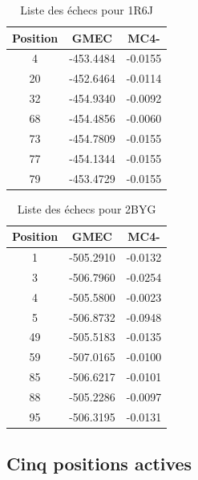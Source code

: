 \documentclass[a4paper,12pt]{article}
\begin{document}
    \begin{table}[h]
      \centering

      \begin{tabular}{|c|c|c|}


        \hline
        Position & GMEC & MC4- \\
        \hline
         4 & -453.4484 & -0.0155  \\
        20 & -452.6464 & -0.0114 \\
        32 & -454.9340 & -0.0092 \\
        68 & -454.4856 & -0.0060 \\
        73 & -454.7809 & -0.0155 \\
        77 & -454.1344 & -0.0155 \\
        79 & -453.4729 & -0.0155 \\
        
        \hline


      \end{tabular}      
      \caption{Liste des échecs pour 1R6J }
      \label{tab_echec1R6J__1}      
    \end{table}


    \begin{table}[h]
      \centering

      \begin{tabular}{|c|c|c|}

        \hline
        Position & GMEC & MC4- \\
        \hline
        1 & -505.2910 & -0.0132 \\
        3 & -506.7960 & -0.0254 \\
        4 & -505.5800 & -0.0023 \\
        5 & -506.8732 & -0.0948 \\
        49 & -505.5183 & -0.0135 \\
        59 & -507.0165 & -0.0100 \\
        85 & -506.6217 & -0.0101 \\
        88 & -505.2286 & -0.0097 \\
        95 & -506.3195 & -0.0131 \\

        \hline


      \end{tabular}      
      \caption{Liste des échecs pour 2BYG }
      \label{tab_echec2BYG__1}      
    \end{table}


   \subsection{ Cinq positions actives}
\end{document}
